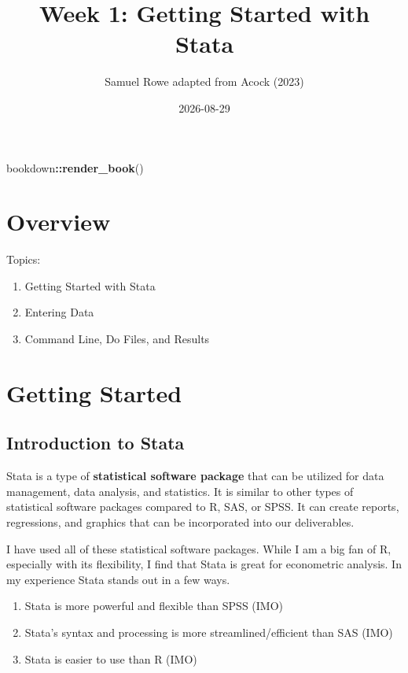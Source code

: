 \documentclass[
]{book}
\title{Week 1: Getting Started with Stata}
\author{Samuel Rowe adapted from Acock (2023)}
\date{2026-08-29}
\newenvironment{Shaded}{\begin{snugshade}}{\end{snugshade}}
\newcommand{\FunctionTok}[1]{\textcolor[rgb]{0.13,0.29,0.53}{\textbf{#1}}}
\newcommand{\NormalTok}[1]{#1}
\newcommand{\SpecialCharTok}[1]{\textcolor[rgb]{0.81,0.36,0.00}{\textbf{#1}}}
\providecommand{\tightlist}{%
  \setlength{\itemsep}{0pt}\setlength{\parskip}{0pt}}
\begin{document}
\maketitle

{
\setcounter{tocdepth}{1}
\tableofcontents
}
\begin{Shaded}
\begin{Highlighting}[]
\NormalTok{bookdown}\SpecialCharTok{::}\FunctionTok{render\_book}\NormalTok{()}
\end{Highlighting}
\end{Shaded}

\chapter*{Overview}\label{overview}

Topics:

\begin{enumerate}
\def\labelenumi{\arabic{enumi}.}
\tightlist
\item
  Getting Started with Stata
\item
  Entering Data
\item
  Command Line, Do Files, and Results
\end{enumerate}

\chapter{Getting Started}\label{getting-started}

\section{Introduction to Stata}\label{introduction-to-stata}

Stata is a type of \textbf{statistical software package} that can be utilized for data management, data analysis, and statistics. It is similar to other types of statistical software packages compared to R, SAS, or SPSS. It can create reports, regressions, and graphics that can be incorporated into our deliverables.

I have used all of these statistical software packages. While I am a big fan of R, especially with its flexibility, I find that Stata is great for econometric analysis. In my experience Stata stands out in a few ways.

\begin{enumerate}
\def\labelenumi{\arabic{enumi}.}
\tightlist
\item
  Stata is more powerful and flexible than SPSS (IMO)
\item
  Stata's syntax and processing is more streamlined/efficient than SAS (IMO)
\item
  Stata is easier to use than R (IMO)
\end{enumerate}
\end{document}
